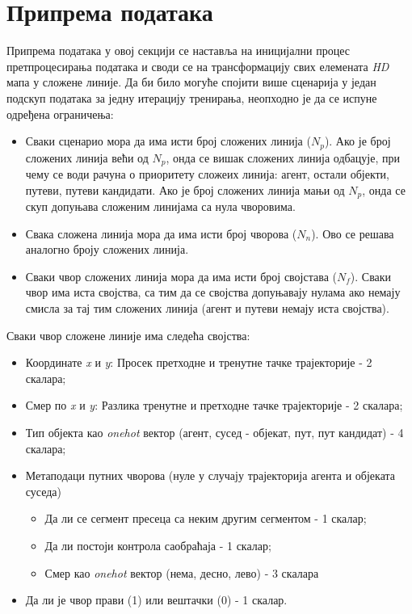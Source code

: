 \documentclass[11pt,oneside]{memoir}
\begin{document}
\section{Припрема података}

Припрема података у овој секцији се наставља на иницијални процес претпроцесирања података и своди се на трансформацију свих елемената
\textit{HD} мапа у сложене линије. Да би било могуће спојити више сценарија у један подскуп података за једну итерацију тренирања, неопходно
је да се испуне одређена ограничења:
\begin{itemize}
  \item Сваки сценарио мора да има исти број сложених линија ($N_{p}$). Ако је број сложених линија већи од $N_{p}$, онда се 
        вишак сложених линија одбацује, при чему се води рачуна о приоритету сложеих линија: агент, остали објекти, путеви, путеви кандидати.
        Ако је број сложених линија мањи од $N_{p}$, онда се скуп допуњава сложеним линијама са нула чворовима.
  \item Свака сложена линија мора да има исти број чворова ($N_{n}$). Ово се решава аналогно броју сложених линија.
  \item Сваки чвор сложених линија мора да има исти број својстава ($N_{f}$). Сваки чвор има иста својства, са тим
        да се својства допуњавају нулама ако немају смисла за тај тим сложених линија (агент и путеви немају иста својства).
\end{itemize}

\noindent Сваки чвор сложене линије има следећа својства:
\begin{itemize}
  \item Координате \textit{x} и \textit{y}: Просек претходне и тренутне тачке трајекторије - 2 скалара;
  \item Смер по \textit{x} и \textit{y}: Разлика тренутне и претходне тачке трајекторије - 2 скалара;
  \item Тип објекта као \textit{onehot} вектор (агент, сусед - објекат, пут, пут кандидат) - 4 скалара;
  \item Метаподаци путних чворова (нуле у случају трајекторија агента и објеката суседа)
    \begin{itemize}
      \item Да ли се сегмент пресеца са неким другим сегментом - 1 скалар;
      \item Да ли постоји контрола саобраћаја - 1 скалар;
      \item Смер као \textit{onehot} вектор (нема, десно, лево) - 3 скалара
    \end{itemize}
  \item Да ли је чвор прави (1) или вештачки (0) - 1 скалар.
\end{itemize}
\end{document}
